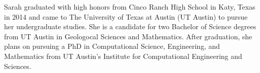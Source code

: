 Sarah graduated with high honors from Cinco Ranch High School in Katy, Texas in 2014 and came to The University of Texas at Austin (UT Austin) to pursue her undergraduate studies. 
She is a candidate for two Bachelor of Science degrees from UT Austin in Geologocal Sciences and Mathematics. 
After graduation, she plans on pursuing a PhD in Computational Science, Engineering, and Mathematics from UT Austin's Institute for Computational Engineering and Sciences.
